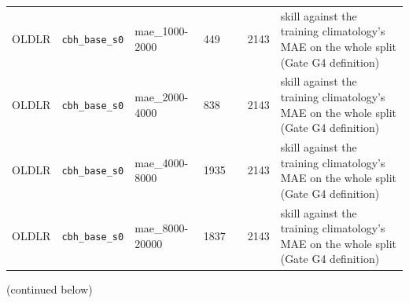 \begin{center}
{\begin{tabular}{lp{2.4cm}llllp{7.3cm}}
OLDLR & \texttt{cbh\_\allowbreak{}base\_\allowbreak{}s0} & mae\_1000-2000 & 449 &  & 2143 & skill against the training climatology's MAE on the whole split (Gate G4 definition) \\
OLDLR & \texttt{cbh\_\allowbreak{}base\_\allowbreak{}s0} & mae\_2000-4000 & 838 &  & 2143 & skill against the training climatology's MAE on the whole split (Gate G4 definition) \\
OLDLR & \texttt{cbh\_\allowbreak{}base\_\allowbreak{}s0} & mae\_4000-8000 & 1935 &  & 2143 & skill against the training climatology's MAE on the whole split (Gate G4 definition) \\
OLDLR & \texttt{cbh\_\allowbreak{}base\_\allowbreak{}s0} & mae\_8000-20000 & 1837 &  & 2143 & skill against the training climatology's MAE on the whole split (Gate G4 definition) \\
\bottomrule
\end{tabular}}\par\footnotesize(continued below)
\end{center}

